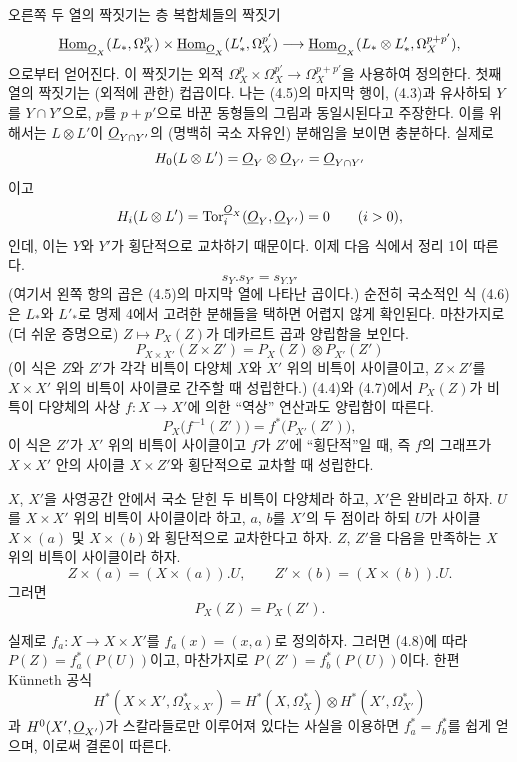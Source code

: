 오른쪽 두 열의 짝짓기는 층 복합체들의 짝짓기
\[
\underline{\operatorname{Hom}}_{\underline{O}_X}(L_{*},\Omega_X^{p})
\times\underline{\operatorname{Hom}}_{\underline{O}_X}(L'_{*},\Omega_X^{p'})
\longrightarrow
\underline{\operatorname{Hom}}_{\underline{O}_X}(L_{*}\otimes L'_{*},\Omega_X^{p+p'}),
\]
으로부터 얻어진다. 이 짝짓기는 외적
$\Omega_X^{p}\times\Omega_X^{p'}\longrightarrow\Omega_X^{p+p'}$을 사용하여
정의한다. 첫째 열의 짝짓기는 (외적에 관한) 컵곱이다. 나는 (4.5)의
마지막 행이, (4.3)과 유사하되 $Y$를 $Y\cap Y'$으로, $p$를 $p+p'$으로
바꾼 동형들의 그림과 동일시된다고 주장한다. 이를 위해서는
$L\otimes L'$이 $\underline{O}_{Y\cap Y'}$의 (명백히 국소 자유인) 분해임을
보이면 충분하다. 실제로
\[
  H_0(L\otimes L')=\underline{O}_Y\otimes\underline{O}_{Y'}=\underline{O}_{Y\cap Y'}
\]
이고
\[
  H_i(L\otimes L')=\operatorname{Tor}_{i}^{\underline{O}_X}(\underline{O}_Y,\underline{O}_{Y'})=0
  \qquad(i>0),
\]
인데, 이는 $Y$와 $Y'$가 횡단적으로 교차하기 때문이다. 이제 다음 식에서
정리 1이 따른다.
\begin{equation}\tag{4.6}
  s_Y.s_{Y'}=s_{Y.Y'}
\end{equation}
(여기서 왼쪽 항의 곱은 (4.5)의 마지막 열에 나타난 곱이다.) 순전히
국소적인 식 (4.6)은 $L_{*}$와 $L'_{*}$로 명제 4에서 고려한 분해들을
택하면 어렵지 않게 확인된다. 마찬가지로 (더 쉬운 증명으로)
$Z\longmapsto P_X(Z)$가 데카르트 곱과 양립함을 보인다.
\begin{equation}\tag{4.7}
  P_{X\times X'}(Z\times Z')=P_X(Z)\otimes P_{X'}(Z')
\end{equation}
(이 식은 $Z$와 $Z'$가 각각 비특이 다양체 $X$와 $X'$ 위의 비특이
사이클이고, $Z\times Z'$를 $X\times X'$ 위의 비특이 사이클로 간주할 때
성립한다.) (4.4)와 (4.7)에서 $P_X(Z)$가 비특이 다양체의 사상
$f:X\longrightarrow X'$에 의한 ``역상'' 연산과도 양립함이 따른다.
\begin{equation}\tag{4.8}
  P_X\bigl(f^{-1}(Z')\bigr)=f^{*}\bigl(P_{X'}(Z')\bigr),
\end{equation}
이 식은 $Z'$가 $X'$ 위의 비특이 사이클이고 $f$가 $Z'$에 ``횡단적''일 때,
즉 $f$의 그래프가 $X\times X'$ 안의 사이클 $X\times Z'$와 횡단적으로
교차할 때 성립한다.

 $X$, $X'$을 사영공간 안에서 국소 닫힌 두 비특이
다양체라 하고, $X'$은 완비라고 하자. $U$를 $X\times X'$ 위의 비특이
사이클이라 하고, $a$, $b$를 $X'$의 두 점이라 하되 $U$가 사이클
$X\times(a)$ 및 $X\times(b)$와 횡단적으로 교차한다고 하자. $Z$, $Z'$을
다음을 만족하는 $X$ 위의 비특이 사이클이라 하자.
\[
  Z\times(a)=(X\times(a)).U,
  \qquad
  Z'\times(b)=(X\times(b)).U.
\]
그러면
\[
  P_X(Z)=P_X(Z').
\]

실제로 $f_a:X\longrightarrow X\times X'$를 $f_a(x)=(x,a)$로 정의하자.
그러면 (4.8)에 따라 $P(Z)=f_a^{*}(P(U))$이고, 마찬가지로
$P(Z')=f_b^{*}(P(U))$이다. 한편 K\"unneth 공식
\[
  H^{*}(X\times X',\Omega_{X\times X'}^{*})
  =H^{*}(X,\Omega_X^{*})\otimes H^{*}(X',\Omega_{X'}^{*})
\]
과 $H^{0}(X',\underline{O}_{X'})$가 스칼라들로만 이루어져 있다는 사실을
이용하면 $f_a^{*}=f_b^{*}$를 쉽게 얻으며, 이로써 결론이 따른다.

